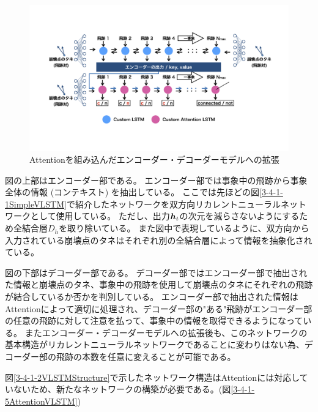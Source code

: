 \begin{figure}[htbp]
 \centering
 \includegraphics[trim = 100 200 100 100, width=1.0\textwidth, clip]{Figure/3Networks/3-4-1-4EncoderDecoderVLSTM.png}
 \caption{Attentionを組み込んだエンコーダー・デコーダーモデルへの拡張}
 \label{3-4-1-4EncoderDecoderVLSTM}
\end{figure}

図の上部はエンコーダー部である。
エンコーダー部では事象中の飛跡から事象全体の情報 (コンテキスト) を抽出している。
ここでは先ほどの図\ref{3-4-1-1SimpleVLSTM}で紹介したネットワークを双方向リカレントニューラルネットワークとして使用している。
ただし、出力${\mbox{\boldmath{$h$}}}_{t}$の次元を減らさないようにするため全結合層$D_h$を取り除いている。
また図中で表現しているように、双方向から入力されている崩壊点のタネはそれぞれ別の全結合層によって情報を抽象化されている。

図の下部はデコーダー部である。
デコーダー部ではエンコーダー部で抽出された情報と崩壊点のタネ、事象中の飛跡を使用して崩壊点のタネにそれぞれの飛跡が結合しているか否かを判別している。
エンコーダー部で抽出された情報はAttentionによって適切に処理され、デコーダー部の"ある"飛跡がエンコーダー部の任意の飛跡に対して注意を払って、事象中の情報を取得できるようになっている。
またエンコーダー・デコーダーモデルへの拡張後も、このネットワークの基本構造がリカレントニューラルネットワークであることに変わりはない為、デコーダー部の飛跡の本数を任意に変えることが可能である。

図\ref{3-4-1-2VLSTMStructure}で示したネットワーク構造はAttentionには対応していないため、新たなネットワークの構築が必要である。(図\ref{3-4-1-5AttentionVLSTM})


